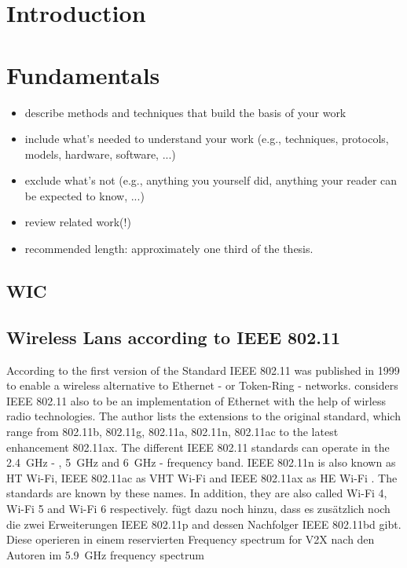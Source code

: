 \documentclass[]{nsm-thesis}
\begin{document}
\cleardoublepage
{}


\chapter{Introduction}
\label{sec:introduction}


\chapter{Fundamentals}
\label{sec:fundamentals}



\begin{itemize}
\item describe methods and techniques that build the basis of your work
\item include what's needed to understand your work (e.g., techniques, protocols, models, hardware, software, ...)
\item exclude what's not (e.g., anything you yourself did, anything your reader can be expected to know, ...)
\item review related work(!)
\item recommended length: approximately one third of the thesis.
\end{itemize}

\section{\acl{WIC}}





\section{Wireless Lans according to IEEE 802.11}
According to \textcite{kauffels_wireless_2002} the first version of the Standard IEEE 802.11 was published in 1999 to enable a wireless alternative to Ethernet - or Token-Ring - networks.
\textcite{sauter_wireless_2022} considers IEEE 802.11 also to be an implementation of Ethernet with the help of wirless radio technologies.
The author lists the extensions to the original standard, which range from 802.11b, 802.11g, 802.11a, 802.11n, 802.11ac to the latest enhancement 802.11ax. The different IEEE 802.11 standards can operate in the  \SI{2.4}{\giga\hertz} - , \SI{5}{\giga\hertz} and \SI{6}{\giga\hertz} - frequency band.
IEEE 802.11n is also known as \ac{HT} Wi-Fi, IEEE 802.11ac as \ac{VHT} Wi-Fi \cite{noauthor_ieee_2021-1} and IEEE 802.11ax as \ac{HE} Wi-Fi \cite{noauthor_ieee_2021}. The standards are known by these names. In addition, they are also called Wi-Fi 4, Wi-Fi 5 and Wi-Fi 6 respectively.
\textcite{jacob_system-level_2020} fügt dazu noch hinzu, dass es zusätzlich noch die zwei Erweiterungen IEEE 802.11p and dessen Nachfolger IEEE 802.11bd gibt. Diese operieren in einem reservierten Frequency spectrum for \ac{V2X} nach den Autoren im  \SI{5.9}{\giga\hertz} frequency spectrum
\end{document}
